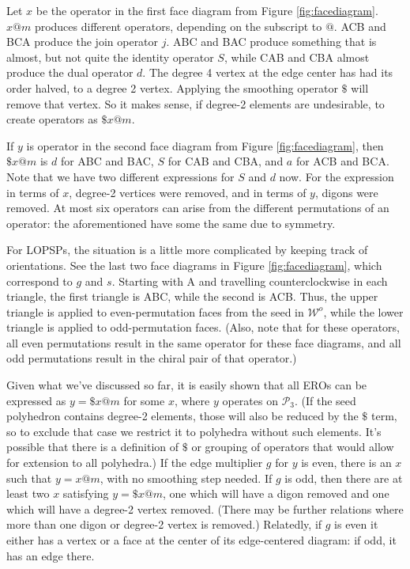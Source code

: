 \documentclass{amsart}[12pt]
\begin{document}
Let $x$ be the operator in the first face diagram from Figure
\ref{fig:facediagram}. $x@m$ produces different operators, depending on the
subscript to $@$. ACB and BCA produce the join operator $j$. ABC and BAC
produce something that is almost, but not quite the identity operator $S$,
while CAB and CBA almost produce the dual operator $d$. The degree 4 vertex at
the edge center has had its order halved, to a degree 2 vertex. Applying the
smoothing operator $\$$ will remove that vertex. So it makes sense, if degree-2
elements are undesirable, to create operators as $\$x@m$.

If $y$ is operator in the second face diagram from Figure \ref{fig:facediagram},
then $\$x@m$ is $d$ for ABC and BAC, $S$ for CAB and CBA, and $a$ for ACB and
BCA. Note that we have two different expressions for $S$ and $d$ now. For the
expression in terms of $x$, degree-2 vertices were removed, and in terms of
$y$, digons were removed.
At most six operators can arise from the different permutations of an operator:
the aforementioned have some the same due to symmetry.

For LOPSPs, the situation is a little more complicated by keeping track of
orientations. See the last two face diagrams in Figure \ref{fig:facediagram},
which correspond to $g$ and $s$. Starting with A and travelling
counterclockwise in each triangle, the first triangle is ABC, while the second
is ACB. Thus, the upper triangle is applied to even-permutation faces from the
seed in $\mathcal{W}^o$, while the lower triangle is applied to odd-permutation
faces. (Also, note that for these operators,
all even permutations result in the same operator for these face diagrams,
and all odd permutations result in the chiral pair of that operator.)

Given what we've discussed so far, it is easily shown that all EROs can be
expressed as $y = \$x@m$ for some $x$, where $y$ operates on $\mathcal{P}_3$.
(If the seed polyhedron contains degree-2 elements, those will also be reduced
by the $\$$ term, so to exclude that case we restrict it to polyhedra without
such elements. It's possible that there is a definition of $\$$ or grouping
of operators that would allow for extension to all polyhedra.) If the edge
multiplier $g$ for $y$ is even, there is an $x$ such that $y = x@m$, with no
smoothing step needed. If $g$ is odd, then there are at least two $x$
satisfying $y = \$x@m$, one which will have a digon removed and one which will
have a degree-2 vertex removed. (There may be further relations where more than
one digon or degree-2 vertex is removed.) Relatedly, if $g$ is even it either
has a vertex or a face at the center of its edge-centered diagram:
if odd, it has an edge there.
\end{document}
